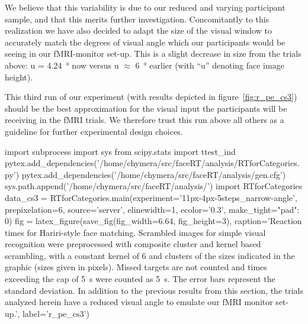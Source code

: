 	    We believe that this variability is due to our reduced and varying participant sample, and that this merits further investigation.
	    Concomitantly to this realization we have also decided to adapt the size of the visual window to accurately match the degrees of visual angle which our participants would be seeing in our fMRI-monitor set-up. This is a slight decrease in size from the trials above: u = \SI{4.24}{\degree} now versus u $\approx$ \SI{6}{\degree} earlier (with “u” denoting face image height).
	    
	    This third run of our experiment (with results depicted in figure~\ref{fig:r_pe_cs3}) should be the best approximation for the visual input the participants will be receiving in the fMRI trials.
	    We therefore trust this run above all others as a guideline for further experimental design choices.
	    \begin{pycode}
		import subprocess
		import sys
		from scipy.stats import ttest_ind
		pytex.add_dependencies('/home/chymera/src/faceRT/analysis/RTforCategories.py')
		pytex.add_dependencies('/home/chymera/src/faceRT/analysis/gen.cfg')
		sys.path.append('/home/chymera/src/faceRT/analysis/')
		import RTforCategories
		data_cs3 = RTforCategories.main(experiment='11px-4px-5steps_narrow-angle', prepixelation=6, source='server', elinewidth=1, ecolor='0.3', make_tight={"pad": 0})
		fig = latex_figure(save_fig(fig_width=6.64, fig_height=3), caption='Reaction times for Hariri-style face matching. Scrambled images for simple visual recognition were preprocessed with composite cluster and kernel based scrambling, with a constant kernel of \SI{6}{\pixel} and clusters of the sizes indicated in the graphic (sizes given in pixels). Missed targets are not counted and times exceeding the cap of \SI{5}{\second} were counted as \SI{5}{\second}. The error bars represent the standard deviation. In addition to the previous results from this section, the trials analyzed herein have a reduced visual angle to emulate our fMRI monitor set-up.', label='r_pe_cs3')
	    \end{pycode}
	    
